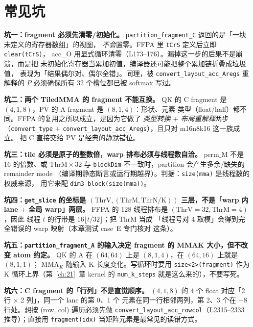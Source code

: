 \section{常见坑}

\textbf{坑一：fragment 必须先清零/初始化。}
\texttt{partition\_\allowbreak{}fragment\_\allowbreak{}C} 返回的是「一块未定义的寄存器数组」的视图，
\emph{不会}置零。FFPA 里 \texttt{tCrS} 定义后立即 \texttt{clear(tCrS)}，
acc\_O 用显式循环清零（L173--176）。漏掉这一步的后果不是崩溃，而是把
未初始化寄存器当累加初值，编译器还可能把整个累加链折叠成垃圾值，
表现为「结果偶尔对、偶尔全错」。同理，被 \texttt{convert\_\allowbreak{}layout\_\allowbreak{}acc\_\allowbreak{}Aregs}
重解释的 $P$ 必须确保所有 32 个槽位都已被 softmax 写过。

\textbf{坑二：两个 TiledMMA 的 fragment 不能互换。}
QK 的 C fragment 是 $(4,1,8)$，PV 的 A fragment 是 $(8,1,4)$：形状、元素
类型（float/half）都不同。FFPA 的复用之所以成立，是因为它做了
\emph{类型转换 $+$ 布局重解释}两步（\texttt{convert\_\allowbreak{}type} $+$
\texttt{convert\_\allowbreak{}layout\_\allowbreak{}acc\_\allowbreak{}Aregs}），且只对 m16n8k16 这一族成立。
把 C 直接交给 PV 是经典的静默错位。

\textbf{坑三：tile 必须是原子的整数倍，warp 排布必须与线程数自洽。}
$\mathrm{perm\_M}$ 不是 $16$ 的倍数、或 $\mathrm{ThrM}\times 32$ 与
\texttt{blockDim} 不一致时，partition 会产生多余/缺失的 remainder mode
（编译期静态断言或运行期越界）。判据：\texttt{size(mma)} 是线程数的权威来源，
用它来配 \texttt{dim3 block\allowbreak{}(size\allowbreak{}(mma))}。

\textbf{坑四：\texttt{get\_slice} 的坐标是 $(\mathrm{ThrV},(\mathrm{ThrM},
\mathrm{ThrN/K}))$ 三层，不是「warp 内 lane $+$ 全局 warp」两层。}
FFPA 的 $128$ 线程排布是 $(\mathrm{ThrV}=32,\mathrm{ThrM}=4)$，因此
线程 $t$ 的行带是 $16\lfloor t/32\rfloor$；把 $\mathrm{ThrM}$ 当成
「线程号对 4 取模」会得到完全错误的 warp 映射（本章测试 case~E 专门核对
这条）。

\textbf{坑五：\texttt{partition\_\allowbreak{}fragment\_\allowbreak{}A} 的输入决定 fragment 的
MMAK 大小，但不改变 atom 约定。}
QK 的 A 在 $(64,64)$ 上是 $(8,1,4)$，在 $(64,16)$ 上就是 $(8,1,1)$；
$\mathrm{MMA}_K$ 随输入 K 长度变化。写循环时要用
\texttt{size\allowbreak{}<2>\allowbreak{}(fragment)} 作为 K 循环上界（第~\ref{ch:21}~章 kernel 的
\texttt{num\_k\_steps} 就是这么来的），不要写死。

\textbf{坑六：C fragment 的「行列」不是直觉顺序。}
$(4,1,8)$ 的 4 个 float 对应「2 行 $\times$ 2 列」，同一个 lane 的第 0、1 个
元素在同一行相邻两列，第 2、3 个在 $+8$ 行处。想按 (row, col) 遍历必须先做
\texttt{convert\_\allowbreak{}layout\_\allowbreak{}acc\_\allowbreak{}rowcol}（L2315--2333 推导）；直接用
\texttt{fragment\allowbreak{}(idx)} 当矩阵元素是最常见的读错方式。

